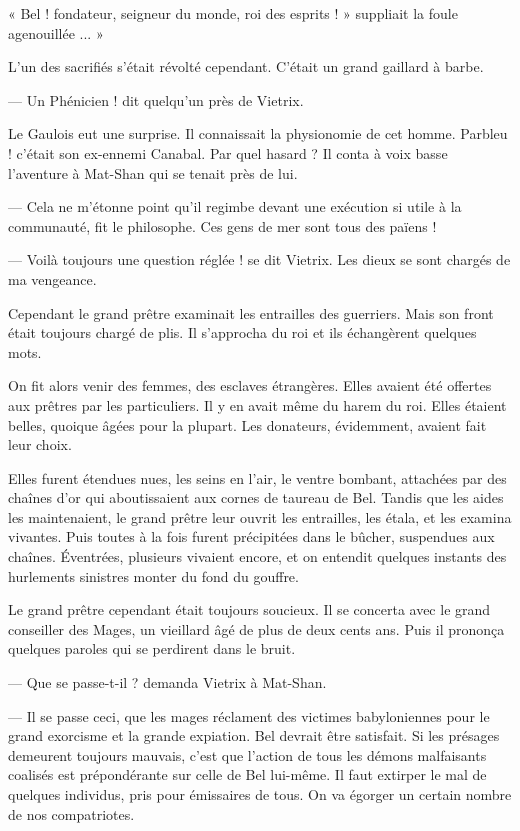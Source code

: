 \documentclass[a4paper, 11pt, oneside, polutonikogreek, french]{article}
\begin{document}
« Bel ! fondateur, seigneur du monde, roi des esprits ! » suppliait la foule agenouillée ... »

L'un des sacrifiés s'était révolté cependant. C'était un grand gaillard à barbe.

--- Un Phénicien ! dit quelqu'un près de Vietrix.

Le Gaulois eut une surprise. Il connaissait la physionomie de cet homme. Parbleu ! c'était son ex-ennemi Canabal. Par quel hasard ? Il conta à voix basse l'aventure à Mat-Shan qui se tenait près de lui.

--- Cela ne m'étonne point qu'il regimbe devant une exécution si utile à la communauté, fit le philosophe. Ces gens de mer sont tous des païens !

--- Voilà toujours une question réglée ! se dit Vietrix. Les dieux se sont chargés de ma vengeance.

Cependant le grand prêtre examinait les entrailles des guerriers. Mais son front était toujours chargé de plis. Il s'approcha du roi et ils échangèrent quelques mots.

\bigskip
\centerline{\EightStarTaper}
\centerline{\EightStarTaper\EightStarTaper}
\bigskip

On fit alors venir des femmes, des esclaves étrangères. Elles avaient été offertes aux prêtres par les particuliers. Il y en avait même du harem du roi. Elles étaient belles, quoique âgées pour la plupart. Les donateurs, évidemment, avaient fait leur choix.

Elles furent étendues nues, les seins en l'air, le ventre bombant, attachées par des chaînes d'or qui aboutissaient aux cornes de taureau de Bel. Tandis que les aides les maintenaient, le grand prêtre leur ouvrit les entrailles, les étala, et les examina vivantes. Puis toutes à la fois furent précipitées dans le bûcher, suspendues aux chaînes. Éventrées, plusieurs vivaient encore, et on entendit quelques instants des hurlements sinistres monter du fond du gouffre.

\bigskip
\centerline{\EightStarTaper}
\centerline{\EightStarTaper\EightStarTaper}
\bigskip

Le grand prêtre cependant était toujours soucieux. Il se concerta avec le grand conseiller des Mages, un vieillard âgé de plus de deux cents ans. Puis il prononça quelques paroles qui se perdirent dans le bruit.

--- Que se passe-t-il ? demanda Vietrix à Mat-Shan.

--- Il se passe ceci, que les mages réclament des victimes babyloniennes pour le grand exorcisme et la grande expiation. Bel devrait être satisfait. Si les présages demeurent toujours mauvais, c'est que l'action de tous les démons malfaisants coalisés est prépondérante sur celle de Bel lui-même. Il faut extirper le mal de quelques individus, pris pour émissaires de tous. On va égorger un certain nombre de nos compatriotes.
\end{document}
